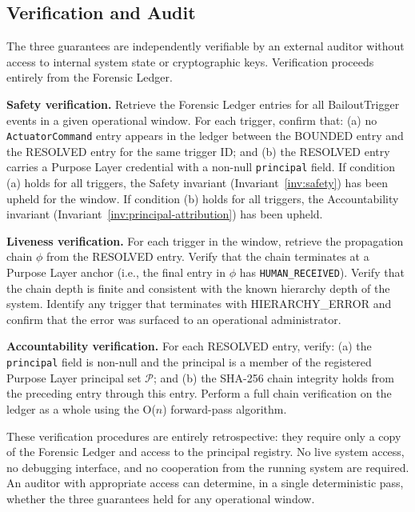 \documentclass[12pt]{article}
\begin{document}
\subsection{Verification and Audit}
\label{sec:guarantee-verification}

The three guarantees are independently verifiable by an external auditor without access to internal system state or cryptographic keys. Verification proceeds entirely from the Forensic Ledger.

\medskip

\noindent\textbf{Safety verification.} Retrieve the Forensic Ledger entries for all BailoutTrigger events in a given operational window. For each trigger, confirm that: (a) no \texttt{ActuatorCommand} entry appears in the ledger between the BOUNDED entry and the RESOLVED entry for the same trigger ID; and (b) the RESOLVED entry carries a Purpose Layer credential with a non-null \texttt{principal} field. If condition (a) holds for all triggers, the Safety invariant (Invariant~\ref{inv:safety}) has been upheld for the window. If condition (b) holds for all triggers, the Accountability invariant (Invariant~\ref{inv:principal-attribution}) has been upheld.

\medskip

\noindent\textbf{Liveness verification.} For each trigger in the window, retrieve the propagation chain $\phi$ from the RESOLVED entry. Verify that the chain terminates at a Purpose Layer anchor (i.e., the final entry in $\phi$ has \texttt{HUMAN\_RECEIVED}). Verify that the chain depth is finite and consistent with the known hierarchy depth of the system. Identify any trigger that terminates with HIERARCHY\_ERROR and confirm that the error was surfaced to an operational administrator.

\medskip

\noindent\textbf{Accountability verification.} For each RESOLVED entry, verify: (a) the \texttt{principal} field is non-null and the principal is a member of the registered Purpose Layer principal set $\mathcal{P}$; and (b) the SHA-256 chain integrity holds from the preceding entry through this entry. Perform a full chain verification on the ledger as a whole using the O($n$) forward-pass algorithm.

These verification procedures are entirely retrospective: they require only a copy of the Forensic Ledger and access to the principal registry. No live system access, no debugging interface, and no cooperation from the running system are required. An auditor with appropriate access can determine, in a single deterministic pass, whether the three guarantees held for any operational window.
\end{document}
